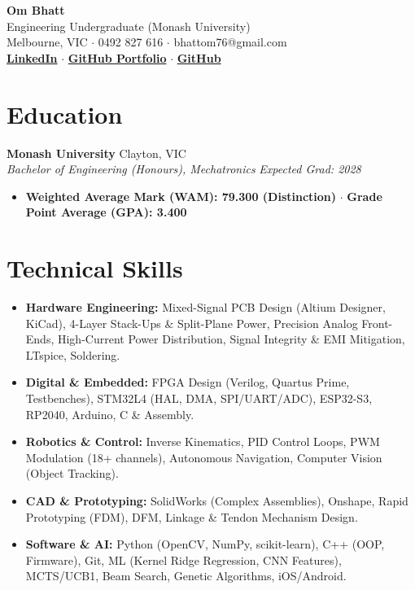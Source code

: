 \documentclass[10pt,a4paper]{article}
\begin{document}
\begin{center}
    {\huge \textbf{Om Bhatt}} \\[0.08em]
    {\large Engineering Undergraduate (Monash University)} \\[0.05em]
    {\color{darkgray} Melbourne, VIC $\cdot$ 0492 827 616 $\cdot$ bhattom76@gmail.com} \\[0.1em]
    \href{https://linkedin.com/in/ombhatt15/}{\textbf{LinkedIn}} $\cdot$
    \href{https://ombhatt15.github.io/}{\textbf{GitHub Portfolio}} $\cdot$
    \href{https://github.com/OmBhatt15}{\textbf{GitHub}}
\end{center}

\section{Education}
\textbf{Monash University} \hfill Clayton, VIC \\
\textit{Bachelor of Engineering (Honours), Mechatronics} \hfill \textit{Expected Grad: 2028}
\begin{itemize}[noitemsep, topsep=1pt, leftmargin=*]
    \item \textbf{Weighted Average Mark (WAM): 79.300 (Distinction)} \quad $\cdot$ \quad \textbf{Grade Point Average (GPA): 3.400}
\end{itemize}

\section{Technical Skills}
\begin{itemize}[noitemsep, topsep=1pt, leftmargin=*]
    \item \textbf{Hardware Engineering:} Mixed-Signal PCB Design (Altium Designer, KiCad), 4-Layer Stack-Ups \& Split-Plane Power, Precision Analog Front-Ends, High-Current Power Distribution, Signal Integrity \& EMI Mitigation, LTspice, Soldering.
    \item \textbf{Digital \& Embedded:} FPGA Design (Verilog, Quartus Prime, Testbenches), STM32L4 (HAL, DMA, SPI/UART/ADC), ESP32-S3, RP2040, Arduino, C \& Assembly.
    \item \textbf{Robotics \& Control:} Inverse Kinematics, PID Control Loops, PWM Modulation (18+ channels), Autonomous Navigation, Computer Vision (Object Tracking).
    \item \textbf{CAD \& Prototyping:} SolidWorks (Complex Assemblies), Onshape, Rapid Prototyping (FDM), DFM, Linkage \& Tendon Mechanism Design.
    \item \textbf{Software \& AI:} Python (OpenCV, NumPy, scikit-learn), C++ (OOP, Firmware), Git, ML (Kernel Ridge Regression, CNN Features), MCTS/UCB1, Beam Search, Genetic Algorithms, iOS/Android.
\end{itemize}
\end{document}
